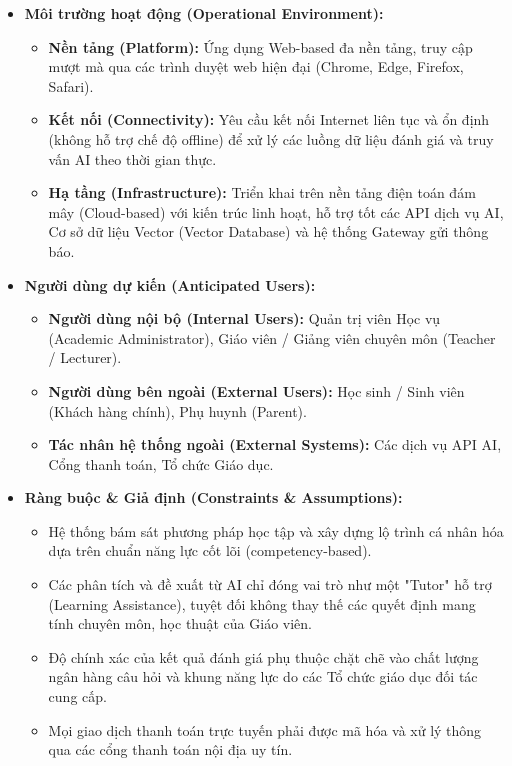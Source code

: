 \begin{itemize}
	\item \textbf{Môi trường hoạt động (Operational Environment):}
	\begin{itemize}
		\item \textbf{Nền tảng (Platform):} Ứng dụng Web-based đa nền tảng, truy cập mượt mà qua các trình duyệt web hiện đại (Chrome, Edge, Firefox, Safari).
		\item \textbf{Kết nối (Connectivity):} Yêu cầu kết nối Internet liên tục và ổn định (không hỗ trợ chế độ offline) để xử lý các luồng dữ liệu đánh giá và truy vấn AI theo thời gian thực.
		\item \textbf{Hạ tầng (Infrastructure):} Triển khai trên nền tảng điện toán đám mây (Cloud-based) với kiến trúc linh hoạt, hỗ trợ tốt các API dịch vụ AI, Cơ sở dữ liệu Vector (Vector Database) và hệ thống Gateway gửi thông báo.
	\end{itemize}
	
	\item \textbf{Người dùng dự kiến (Anticipated Users):}
	\begin{itemize}
		\item \textbf{Người dùng nội bộ (Internal Users):} Quản trị viên Học vụ (Academic Administrator), Giáo viên / Giảng viên chuyên môn (Teacher / Lecturer).
		\item \textbf{Người dùng bên ngoài (External Users):} Học sinh / Sinh viên (Khách hàng chính), Phụ huynh (Parent).
		\item \textbf{Tác nhân hệ thống ngoài (External Systems):} Các dịch vụ API AI, Cổng thanh toán, Tổ chức Giáo dục.
	\end{itemize}
	
	\item \textbf{Ràng buộc \& Giả định (Constraints \& Assumptions):}
	\begin{itemize}
		\item Hệ thống bám sát phương pháp học tập và xây dựng lộ trình cá nhân hóa dựa trên chuẩn năng lực cốt lõi (competency-based).
		\item Các phân tích và đề xuất từ AI chỉ đóng vai trò như một "Tutor" hỗ trợ (Learning Assistance), tuyệt đối không thay thế các quyết định mang tính chuyên môn, học thuật của Giáo viên.
		\item Độ chính xác của kết quả đánh giá phụ thuộc chặt chẽ vào chất lượng ngân hàng câu hỏi và khung năng lực do các Tổ chức giáo dục đối tác cung cấp.
		\item Mọi giao dịch thanh toán trực tuyến phải được mã hóa và xử lý thông qua các cổng thanh toán nội địa uy tín.
	\end{itemize}
	

\end{itemize}
